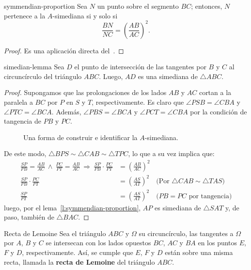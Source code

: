 \begin{section-lemma.tcb}{}{symmendian-proportion}
    Sea $N$ un punto sobre el segmento $BC$; entonces, $N$ pertenece a la $A$\nobreakdash-simediana si y solo si
    \[
        \frac{BN}{NC} = \left(\frac{AB}{AC}\right)^2.
    \]
\end{section-lemma.tcb}

\begin{proof}
    Es una aplicación directa del~.
\end{proof}


\begin{section-lemma.tcb}{}{simedian-lemma}
    Sea $D$ el punto de intersección de las tangentes por $B$ y $C$ al circuncírculo del triángulo $ABC$.
    Luego, $AD$ es una simediana de $\triangle ABC$.
\end{section-lemma.tcb}

\begin{proof}
    Supongamos que las prolongaciones de los lados $AB$ y $AC$ cortan a la paralela a $BC$ por $P$ en $S$ y $T$, respectivamente.
    Es claro que $\angle PSB = \angle CBA$ y $\angle PTC = \angle BCA$.
    Además, $\angle PBS = \angle BCA$ y $\angle PCT = \angle CBA$ por la condición de tangencia de $PB$ y $PC$.

    \begin{figure}[H]
        \centering
        
        \caption{Una forma de construir e identificar la $A$-simediana.}
    \end{figure}

    De este modo, $\triangle BPS \sim \triangle CAB \sim \triangle TPC$, lo que a su vez implica que:
    \begin{align*}
        \frac{SP}{PB} = \frac{AB}{AC} \ \land \ \frac{PC}{PT} = \frac{AB}{AC}
        \ \Rightarrow \ \frac{SP}{PB} \cdot \frac{PC}{PT} &= \left(\frac{AB}{AC}\right)^2\\
        \frac{SP}{PB} \cdot \frac{PC}{PT} &= \left(\frac{AS}{AT}\right)^2 \quad \text{(Por $\triangle CAB \sim \triangle TAS$)}\\
        \frac{SP}{PT}  &= \left(\frac{AS}{AT}\right)^2 \quad \text{($PB = PC$ por tangencia)}
    \end{align*}
    luego, por el lema~\ref{l:symmendian-proportion}, $AP$ es simediana de $\triangle SAT$ y, de paso, también de $\triangle BAC$.
\end{proof}


\begin{section-definition.tcb}{Recta de Lemoine}{}
    Sea el triángulo $ABC$ y $\Omega$ su circuncírculo, las tangentes a $\Omega$ por $A$, $B$ y $C$ se intersecan con los lados opuestos $BC$, $AC$ y $BA$ en los puntos $E$, $F$ y $D$, respectivamente.
    Así, se cumple que $E$, $F$ y $D$ están sobre una misma recta, llamada la \textbf{recta de Lemoine} del triángulo $ABC$.
\end{section-definition.tcb}






